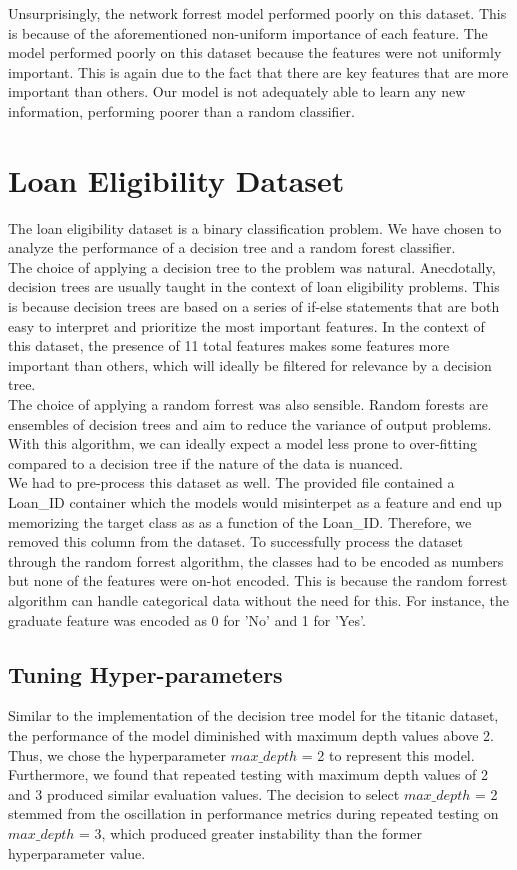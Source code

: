 \documentclass{article}
\begin{document}
Unsurprisingly, the network forrest model performed poorly on this dataset. This is because of the aforementioned non-uniform importance of each feature.
The model performed poorly on this dataset because the features were not uniformly important. This is again due to the fact that there are key features that are more important than others.
Our model is not adequately able to learn any new information, performing poorer than a random classifier.


\newpage
\section*{Loan Eligibility Dataset}
The loan eligibility dataset is a binary classification problem. We have chosen to analyze the performance of a decision tree and a random forest classifier.
\\

The choice of applying a decision tree to the problem was natural. Anecdotally, decision trees are usually taught in the context of loan eligibility problems. 
This is because decision trees are based on a series of if-else statements that are both easy to interpret and prioritize the most important features.
In the context of this dataset, the presence of 11 total features makes some features more important than others, which will ideally be filtered for relevance by a decision tree.
\\

The choice of applying a random forrest was also sensible. Random forests are ensembles of decision trees and aim to reduce the variance of output problems.
With this algorithm, we can ideally expect a model less prone to over-fitting compared to a decision tree if the nature of the data is nuanced.
\\

We had to pre-process this dataset as well. The provided file contained a Loan\_ID container which the models would misinterpet as a feature and end up memorizing the target class as
as a function of the Loan\_ID. Therefore, we removed this column from the dataset. To successfully process the dataset through the random forrest algorithm, the classes had to be encoded as numbers
but none of the features were on-hot encoded. This is because the random forrest algorithm can handle categorical data without the need for this. For instance, the graduate feature was encoded as 0 for 'No' and 1 for 'Yes'.

\subsection*{Tuning Hyper-parameters}
Similar to the implementation of the decision tree model for the titanic dataset,
the performance of the model diminished with maximum depth values above 2.
Thus, we chose the hyperparameter $max\_depth$ = 2 to represent this model.
Furthermore, we found that repeated testing with maximum depth values of 2 and 3
produced similar evaluation values.
The decision to select $max\_depth$ = 2 stemmed from the oscillation in performance
metrics during repeated testing on $max\_depth$ = 3, 
which produced greater instability than the former hyperparameter value. 
\\
\end{document}
